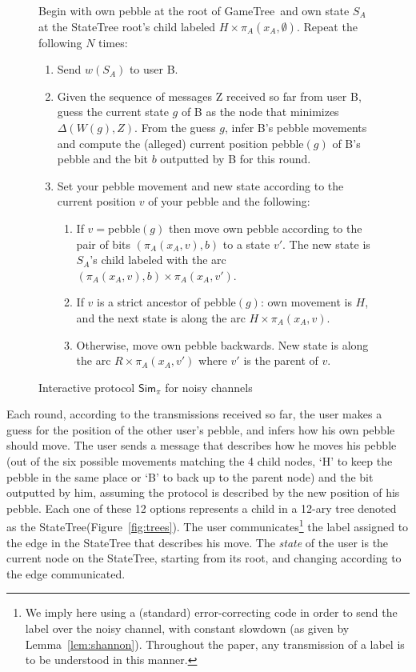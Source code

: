 \documentclass[ letterpaper, 11pt]{article}
\newcommand{\gametree}{\textsf{GameTree}\xspace}
\newcommand{\statetree}{{\textsf{StateTree}}\xspace}
\newcommand{\Sim}{{\mathsf{Sim}_\pi}}
\begin{document}
\begin{figure}[htb]
\begin{framed}
\small
Begin with own pebble at the root of \gametree\ and own state $S_A$ at the \statetree root's child labeled
$H \times \pi_A(x_A, \emptyset)$.
Repeat the following $N$ times\footnotemark:
\begin{enumerate}
\item Send $w(S_A)$ to user B.
\item Given the sequence of messages Z received so far from user B, guess the
current state $g$ of B as the node that minimizes $\Delta(W(g),Z)$.
From the guess $g$, infer
B's pebble movements and compute the (alleged) current position pebble$(g)$ of B's pebble and the bit $b$ outputted by B for this round.
\item Set your pebble movement and new state according to the current position $v$ of your pebble  and the following:
    \begin{enumerate}
    \item If $v={}$pebble$(g)$ then move own pebble according to the pair of bits
    $(\pi_A(x_A,v),b)$ to a state $v'$.
    The new state is $S_A$'s child labeled with the arc $(\pi_A(x_A,v),b)\times \pi_A( x_A, v')$.
    \item If $v$ is a strict ancestor of pebble$(g)$: own movement is $H$, and the
    next state is along the arc $H\times \pi_A(x_A,v)$.
    \item Otherwise, move own pebble backwards. New state is along the arc $R\times \pi_A(x_A,v')$
    where $v'$ is the parent of $v$.
    \end{enumerate}
\end{enumerate}
\end{framed}
\caption{Interactive protocol $\Sim$ for noisy channels~\cite{schulman96}}
\label{alg:protocol}
\end{figure}

Each round, according to the transmissions received so far,
the user makes a guess for the position of the other user's pebble,
and infers how his own pebble should  move.
The user sends a message that describes
how he moves his pebble (out of the six possible movements matching the
4 child nodes, `H' to keep the pebble in the same place or `B' to back up to the parent node) and
the bit outputted by him, assuming the protocol is
described by the new position of his pebble.
Each one of these  12 options represents a child in a 12-ary
tree denoted as the \statetree (Figure~\ref{fig:trees}).
The user communicates\footnote
{We imply here using a (standard) error-correcting code in order to send the label over the
noisy channel, with constant slowdown (as given by Lemma~\ref{lem:shannon}).
Throughout the paper, any transmission of a label is to be understood in this manner.}
the label
assigned to the edge in the \statetree that describes his move. The \emph{state} of the user
is the current node on the \statetree, starting from its root,
and changing according to the edge communicated.
\end{document}
